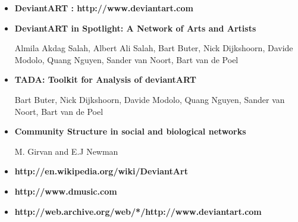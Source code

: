 \documentclass[12pt,a4paper]{report}
\begin{document}
\begin{itemize}

\item \textbf{DeviantART : http://www.deviantart.com} \\

\item \textbf{DeviantART in Spotlight: A Network of Arts and Artists }

Almila Akdag Salah, Albert Ali Salah, Bart Buter, Nick Dijkshoorn, Davide Modolo, Quang Nguyen, Sander van Noort, Bart van de Poel \\

\item \textbf{TADA: Toolkit for Analysis of deviantART}

Bart Buter, Nick Dijkshoorn, Davide Modolo, Quang Nguyen, Sander van Noort, Bart van de Poel \\

\item \textbf{Community Structure in social and biological networks}

M. Girvan and E.J Newman \\

\item \textbf{http://en.wikipedia.org/wiki/DeviantArt} \\

\item \textbf{http://www.dmusic.com} \\

\item \textbf{http://web.archive.org/web/*/http://www.deviantart.com} \\

\end{itemize}
\end{document}
